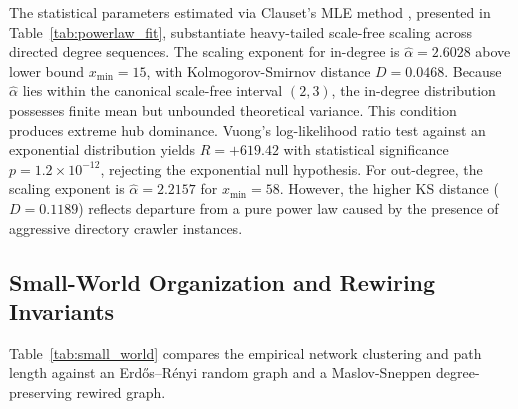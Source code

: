 \documentclass[conference]{IEEEtran}
\begin{document}
The statistical parameters estimated via Clauset's MLE method \cite{clauset2009power}, presented in Table~\ref{tab:powerlaw_fit}, substantiate heavy-tailed scale-free scaling across directed degree sequences. The scaling exponent for in-degree is $\hat{\alpha} = 2.6028$ above lower bound $x_{\min} = 15$, with Kolmogorov-Smirnov distance $D = 0.0468$. Because $\hat{\alpha}$ lies within the canonical scale-free interval $(2, 3)$, the in-degree distribution possesses finite mean but unbounded theoretical variance. This condition produces extreme hub dominance. Vuong's log-likelihood ratio test against an exponential distribution yields $R = +619.42$ with statistical significance $p = 1.2 \times 10^{-12}$, rejecting the exponential null hypothesis. For out-degree, the scaling exponent is $\hat{\alpha} = 2.2157$ for $x_{\min} = 58$. However, the higher KS distance ($D = 0.1189$) reflects departure from a pure power law caused by the presence of aggressive directory crawler instances.

\subsection{Small-World Organization and Rewiring Invariants}

Table~\ref{tab:small_world} compares the empirical network clustering and path length against an Erd\H{o}s--R\'enyi random graph and a Maslov-Sneppen degree-preserving rewired graph.

\begin{table}[htbp]
\caption{Small-World Benchmarking Against Random and Degree-Preserving Baselines}
\label{tab:small_world}
\centering
{}
\end{table}
\end{document}
